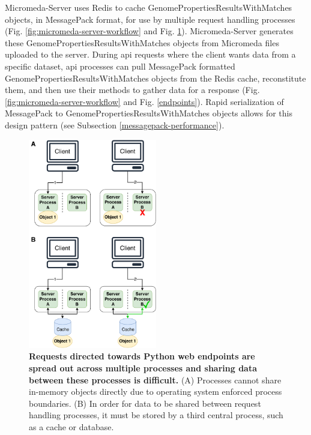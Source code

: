 Micromeda-Server uses Redis to cache GenomePropertiesResultsWithMatches objects, in MessagePack format, for use by multiple request handling processes (Fig. \ref{fig:micromeda-server-workflow} and Fig. \ref{fig:client-processing}). Micromeda-Server generates these GenomePropertiesResultsWithMatches objects from Micromeda files uploaded to the server. During \gls{api} requests where the client wants data from a specific dataset, \gls{api} processes can pull MessagePack formatted GenomePropertiesResultsWithMatches objects from the Redis cache, reconstitute them, and then use their methods to gather data for a response (Fig. \ref{fig:micromeda-server-workflow} and Fig. \ref{endpoints}). Rapid serialization of MessagePack to GenomePropertiesResultsWithMatches objects allows for this design pattern (see Subsection \ref{messagepack-performance}).

\begin{figure}[!ht]
  \centering
	\includegraphics[width=0.50\textwidth]{media/Client-Processing.pdf}
	 \caption[Requests directed towards Python web endpoints are spread out across multiple processes and sharing data between these processes is difficult.]{\textbf{Requests directed towards Python web endpoints are spread out across multiple processes and sharing data between these processes is difficult.} (A) Processes cannot share in-memory objects directly due to operating system enforced process boundaries. (B) In order for data to be shared between request handling processes, it must be stored by a third central process, such as a cache or database.}
	 \label{fig:client-processing}
\end{figure}

